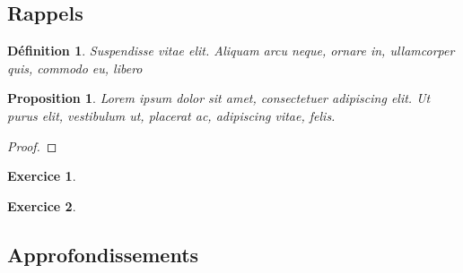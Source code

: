 \documentclass[12pt,a4paper]{scrartcl}
\theoremstyle{plain}
\newtheorem{proposition}[theoreme]{Proposition}
\newtheorem{definition}[theoreme]{Définition}
\newtheorem{exo}{Exercice}
\begin{document}
\subsection{Rappels}

\begin{definition}
Suspendisse vitae elit. Aliquam arcu neque, ornare in, ullamcorper quis, commodo eu, libero
\end{definition}

\begin{proposition}
Lorem ipsum dolor sit amet, consectetuer adipiscing elit. Ut purus
elit, vestibulum ut, placerat ac, adipiscing vitae, felis.
\end{proposition}

\begin{proof}
\lipsum[4]
\end{proof}

\begin{exo}
\lipsum[2][1-3]
\end{exo}

\begin{exo}
\lipsum[4][1-3]
\end{exo}



\subsection{Approfondissements}
\end{document}
